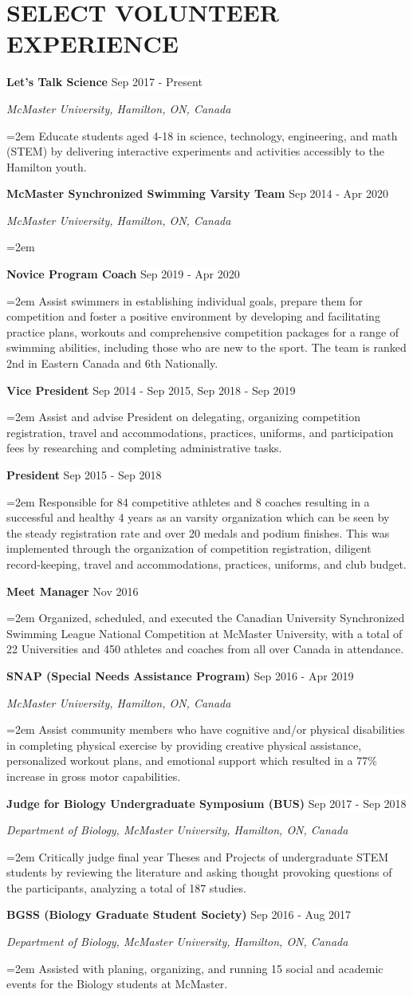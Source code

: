 \documentclass[paper=a4,fontsize=11pt]{scrartcl}	 			%
\newcommand{\NewPart}[1]{\section*{\uppercase{#1}}}
\newcommand{\EducationEntry}[4]{
		\noindent \textbf{#1} \hfill 					%
		\colorbox{White}{%
			\parbox{10em}{%
			\hfill\color{Black}#2}} \par				%
		\noindent \textit{#3} \par					%
		\noindent\hangindent=2em\hangafter=0 \small #4 	%
		\normalsize \par}
\newcommand{\WorkEntry}[4]{						%
		\noindent \textbf{#1} \hfill 					%
		\colorbox{White}{\color{Black}#2} \par		%
		\noindent \textit{#3} \par					%
		\noindent\hangindent=2em\hangafter=0 \small #4 	%
		\normalsize \par}
\newcommand{\WorkEntryB}[3]{						%
	\noindent \textbf{#1} \hfill 					%
	\colorbox{White}{\color{Black}#2} \par		%
	\noindent \textit{#3} \par					%
	\noindent\hangindent=2em\hangafter=0 \small  	%
	\normalsize \par}
\newcommand{\WorkEntryD}[3]{						%
	\indent \indent \textbf{#1} \hfill 					%
	\colorbox{White}{\color{Black}#2} \par		%
	\hangindent=2em\hangafter=0 \small  #3 \par
    \normalsize }
\begin{document}
\NewPart{Select Volunteer Experience}{}
\WorkEntry{Let's Talk Science}{Sep 2017 - Present}{McMaster University, Hamilton, ON, Canada}{Educate students aged 4-18 in science, technology, engineering, and math (STEM) by delivering interactive experiments and activities accessibly to the Hamilton youth.}
\WorkEntryB{McMaster Synchronized Swimming Varsity Team}{Sep 2014 - Apr 2020}{McMaster University, Hamilton, ON, Canada}
\WorkEntryD{Novice Program Coach}{Sep 2019 - Apr 2020}{
	\noindent Assist swimmers in establishing individual goals, prepare them for competition and foster a positive environment by developing and facilitating practice plans, workouts and comprehensive competition packages for a range of swimming abilities, including those who are new to the sport. The team is ranked 2nd in Eastern Canada and 6th Nationally.}
\WorkEntryD{Vice President}{Sep 2014 - Sep 2015, Sep 2018 - Sep 2019}{
	\noindent Assist and advise President on delegating, organizing competition registration, travel and accommodations, practices, uniforms, and participation fees by researching and completing administrative tasks.}
\WorkEntryD{President}{Sep 2015 - Sep 2018}{
	\noindent Responsible for 84 competitive athletes and 8 coaches resulting in a successful and healthy 4 years as an varsity organization which can be seen by the steady registration rate and over 20 medals and podium finishes. This was implemented through the organization of competition registration, diligent record-keeping, travel and accommodations, practices, uniforms, and club budget.}
\WorkEntryD{Meet Manager}{Nov 2016}{
	\noindent Organized, scheduled, and executed the Canadian University Synchronized Swimming League National Competition at McMaster University, with a total of 22 Universities and 450 athletes and coaches from all over Canada in attendance.}
\WorkEntry{SNAP (Special Needs Assistance Program)}{Sep 2016 - Apr 2019}{McMaster University, Hamilton, ON, Canada}{Assist community members who have cognitive and/or physical disabilities in completing physical exercise by providing creative physical assistance, personalized workout plans, and emotional support which resulted in a 77\% increase in gross motor capabilities.}
\WorkEntry{Judge for Biology Undergraduate Symposium (BUS)}{Sep 2017 - Sep 2018}{Department of Biology, McMaster University, Hamilton, ON, Canada}{Critically judge final year Theses and Projects of undergraduate STEM students by reviewing the literature and asking thought provoking questions of the participants, analyzing a total of 187 studies.}
\WorkEntry{BGSS (Biology Graduate Student Society)}{Sep 2016 - Aug 2017}{Department of Biology, McMaster University, Hamilton, ON, Canada}{Assisted with planing, organizing, and running 15 social and academic events for the Biology students at McMaster.}
\end{document}
